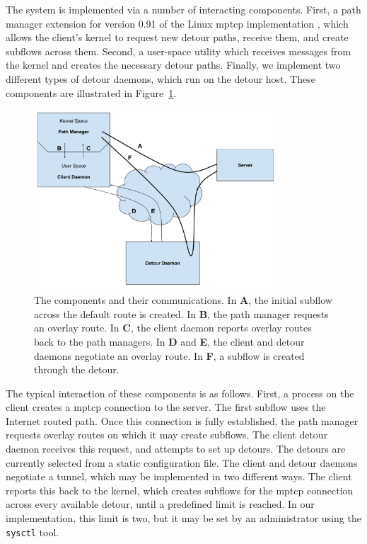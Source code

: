 \documentclass{cwru}
\begin{document}
The system is implemented via a number of interacting components. First, a path
manager extension for version 0.91 of the Linux \ac{mptcp} implementation
\cite{mptcp}, which allows the client's kernel to request new detour paths,
receive them, and create subflows across them. Second, a user-space utility
which receives messages from the kernel and creates the necessary detour paths.
Finally, we implement two different types of detour daemons, which run on the
detour host. These components are illustrated in Figure~\ref{f:MovingParts}.

\begin{figure}[h]
  \centering
  \includegraphics[width=0.8\textwidth]{figures/MovingParts.pdf}
  \caption[Interaction of client, detour, and server]{
    The components and their communications. In \textbf{A}, the initial subflow
    across the default route is created. In \textbf{B}, the path manager
    requests an overlay route. In \textbf{C}, the client daemon reports overlay
    routes back to the path managers. In \textbf{D} and \textbf{E}, the client
    and detour daemons negotiate an overlay route. In \textbf{F}, a subflow is
    created through the detour.
  }
  \label{f:MovingParts}
\end{figure}

The typical interaction of these components is as follows. First, a process on
the client creates a \ac{mptcp} connection to the server. The first subflow uses
the Internet routed path. Once this connection is fully established, the path
manager requests overlay routes on which it may create subflows. The client
detour daemon receives this request, and attempts to set up detours. The detours
are currently selected from a static configuration file. The client and detour
daemons negotiate a tunnel, which may be implemented in two different ways. The
client reports this back to the kernel, which creates subflows for the
\ac{mptcp} connection across every available detour, until a predefined limit is
reached. In our implementation, this limit is two, but it may be set by an
administrator using the \texttt{sysctl} tool.
\end{document}
